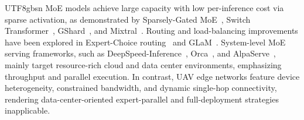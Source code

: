 \documentclass[journal]{IEEEtran}
\begin{document}
\begin{CJK*}{UTF8}{gbsn}
MoE models achieve large capacity with low per-inference cost via sparse activation, as demonstrated by Sparsely-Gated MoE~\cite{shazeer2017moe}, Switch Transformer~\cite{fedus2022switch}, GShard~\cite{lepikhin2021gshard}, and Mixtral~\cite{jiang2024mixtral}. Routing and load-balancing improvements have been explored in Expert-Choice routing~\cite{zhou2022mixtureofexperts_routing} and GLaM~\cite{du2022glam}. System-level MoE serving frameworks, such as DeepSpeed-Inference~\cite{aminabadi2022deepspeed}, Orca~\cite{yu2022orca}, and AlpaServe~\cite{li2023alpaserve}, mainly target resource-rich cloud and data center environments, emphasizing throughput and parallel execution. In contrast, UAV edge networks feature device heterogeneity, constrained bandwidth, and dynamic single-hop connectivity, rendering data-center-oriented expert-parallel and full-deployment strategies inapplicable. 


\end{CJK*}
\end{document}
